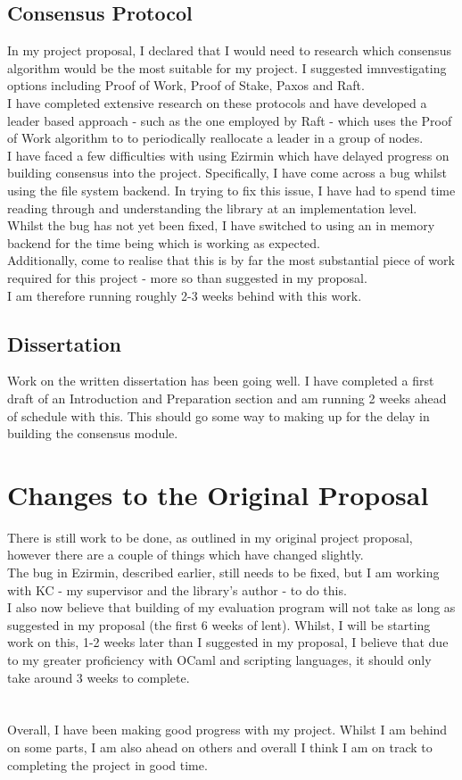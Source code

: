 \documentclass[12pt]{article}
\begin{document}
\subsection*{Consensus Protocol}
In my project proposal, I declared that I would need to research which consensus algorithm would be the most suitable for my project. 
I suggested imnvestigating options including Proof of Work, Proof of Stake, Paxos and Raft.\\
I have completed extensive research on these protocols and have developed a leader based approach - such as the one employed by Raft - which uses the Proof of Work algorithm to to periodically reallocate a leader in a group of nodes.\\
I have faced a few difficulties with using Ezirmin which have delayed progress on building consensus into the project. Specifically, I have come across a bug whilst using the file system backend. In trying to fix this issue, I have had to spend time reading through and understanding the library at an implementation level.\\
Whilst the bug has not yet been fixed, I have switched to using an in memory backend for the time being which is working as expected.\\
Additionally, come to realise that this is by far the most substantial piece of work required for this project - more so than suggested in my proposal.\\
I am therefore running roughly 2-3 weeks behind with this work.
\subsection*{Dissertation}
Work on the written dissertation has been going well. 
I have completed a first draft of an Introduction and Preparation section and am running 2 weeks ahead of schedule with this.
This should go some way to making up for the delay in building the consensus module.
\section{Changes to the Original Proposal}
There is still work to be done, as outlined in my original project proposal, however there are a couple of things which have changed slightly.\\
The bug in Ezirmin, described earlier, still needs to be fixed, but I am working with KC - my supervisor and the library's author - to do this.\\
I also now believe that building of my evaluation program will not take as long as suggested in my proposal (the first 6 weeks of lent).
Whilst, I will be starting work on this, 1-2 weeks later than I suggested in my proposal, I believe that due to my greater proficiency with OCaml and scripting languages, it should only take around 3 weeks to complete.\\
\\
\\
Overall, I have been making good progress with my project. Whilst I am behind on some parts, I am also ahead on others and overall I think I am on track to completing the project in good time.
\end{document}
